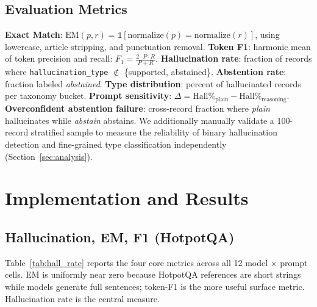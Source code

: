 \documentclass[11pt,a4paper]{article}
\newcommand{\lbl}[1]{\textit{#1}}
\begin{document}
\subsection{Evaluation Metrics}

\textbf{Exact Match}: $\text{EM}(p, r) = \mathbb{1}[\text{normalize}(p) = \text{normalize}(r)]$, using lowercase, article stripping, and punctuation removal.
\textbf{Token F1}: harmonic mean of token precision and recall: $F_1 = \frac{2 \cdot P \cdot R}{P + R}$.
\textbf{Hallucination rate}: fraction of records where \texttt{hallucination\_type} $\notin$ \{supported, abstained\}.
\textbf{Abstention rate}: fraction labeled \lbl{abstained}.
\textbf{Type distribution}: percent of hallucinated records per taxonomy bucket.
\textbf{Prompt sensitivity}: $\Delta = \text{Hall}\%_{\text{plain}} - \text{Hall}\%_{\text{reasoning}}$.
\textbf{Overconfident abstention failure}: cross-record fraction where \lbl{plain} hallucinates while \lbl{abstain} abstains. We additionally manually validate a 100-record stratified sample to measure the reliability of binary hallucination detection and fine-grained type classification independently (Section~\ref{sec:analysis}).

\section{Implementation and Results}
\label{sec:results}

\subsection{Hallucination, EM, F1 (HotpotQA)}

Table~\ref{tab:hall_rate} reports the four core metrics across all 12 model $\times$ prompt cells. EM is uniformly near zero because HotpotQA references are short strings while models generate full sentences; token-F1 is the more useful surface metric. Hallucination rate is the central measure.
\end{document}
